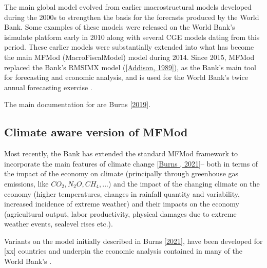 \documentclass[letterpaper,10pt,english]{jupyterBook}
\begin{document}
\sphinxAtStartPar
The main  global model evolved from earlier macro\sphinxhyphen{}structural models developed during the 2000s to strengthen the basis for the forecasts produced by the World Bank. Some examples of these models were released on the World Bank’s isimulate platform early in 2010 along with several CGE models dating from this period. These earlier models were substantially extended into what has become the main MFMod (MacroFiscalModel) model during 2014. Since 2015, MFMod replaced the Bank’s RMSIM\sphinxhyphen{}X model ({[}\hyperlink{cite.content/99_BackMatter/References:id20}{Addison, 1989}{]}), as the Bank’s main tool for forecasting and economic analysis, and is used for the World Bank’s twice annual forecasting exercise .

\sphinxAtStartPar
The main documentation for  are Burns  {[}\hyperlink{cite.content/99_BackMatter/References:id15}{2019}{]}.


\subsection{Climate aware version of MFMod}
\label{\detokenize{content/01_Introduction/Introduction:climate-aware-version-of-mfmod}}
\sphinxAtStartPar
Most recently, the Bank has extended the standard MFMod framework to incorporate the main features of climate change {[}\hyperlink{cite.content/99_BackMatter/References:id14}{Burns , 2021}{]}– both in terms of the impact of the economy on climate (principally through green\sphinxhyphen{}house gas emissions, like \(CO_2, N_{2}O, CH_4, ...\)) and the impact of the changing climate on the economy (higher temperatures, changes in rainfall quantity and variability, increased incidence of extreme weather) and their impacts on the economy (agricultural output, labor productivity, physical damages due to extreme weather events, sea\sphinxhyphen{}level rises etc.).

\sphinxAtStartPar
Variants on the model initially described in  Burns  {[}\hyperlink{cite.content/99_BackMatter/References:id14}{2021}{]}, have been developed for {[}xx{]} countries and underpin the economic analysis contained in many of the World Bank’s  .
\end{document}

